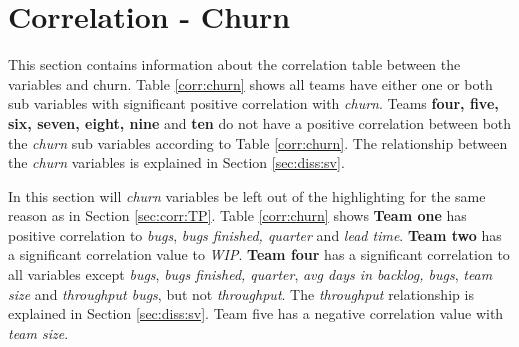 \documentclass[UKenglish]{ifimaster}  %
\begin{document}
 
 

\section{Correlation - Churn}
\label{sec:corr:churn}
This section contains information about the correlation table between the variables and churn. Table \ref{corr:churn} shows all teams have either one or both sub variables with significant positive correlation with \textit{churn}. Teams \textbf{four, five, six, seven, eight, nine} and \textbf{ten} do not have a positive correlation between both the \textit{churn} sub variables according to Table \ref{corr:churn}. The relationship between the \textit{churn} variables is explained in Section \ref{sec:diss:sv}. 

In this section will \textit{churn} variables be left out of the highlighting for the same reason as in Section \ref{sec:corr:TP}.
Table \ref{corr:churn} shows \textbf{Team one} has positive correlation to \textit{bugs}, \textit{bugs finished, quarter} and \textit{lead time}. \textbf{Team two} has a significant correlation value to \textit{WIP}. \textbf{Team four} has a significant correlation to all variables except \textit{bugs}, \textit{bugs finished, quarter}, \textit{avg days in backlog, bugs}, \textit{team size} and \textit{throughput bugs}, but not \textit{throughput}. The \textit{throughput} relationship is explained in Section \ref{sec:diss:sv}. {Team five} has a negative correlation value with \textit{team size}. 
\end{document}
